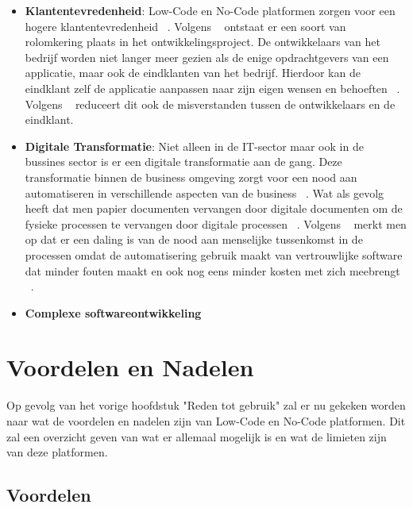 \begin{itemize}
    \item \textbf{Klantentevredenheid}:
    Low-Code en No-Code platformen zorgen voor een hogere klantentevredenheid ~\autocite{Elshan2023}.
    Volgens ~\textcite{Elshan2023} ontstaat er een soort van rolomkering plaats in het ontwikkelingsproject. De ontwikkelaars van het bedrijf worden niet langer meer gezien als de enige
    opdrachtgevers van een applicatie, maar ook de eindklanten van het bedrijf. Hierdoor kan de eindklant zelf de applicatie aanpassen naar zijn eigen wensen en behoeften ~\autocite{Elshan2023}.
    Volgens ~\textcite{Elshan2023} reduceert dit ook de misverstanden tussen de ontwikkelaars en de eindklant.
    \item \textbf{Digitale Transformatie}: 
    Niet alleen in de IT-sector maar ook in de bussines sector is er een digitale transformatie aan de gang. 
    Deze transformatie binnen de business omgeving zorgt voor een nood aan automatiseren in verschillende aspecten van de business ~\autocite{ALSAADI_2021}.
    Wat als gevolg heeft dat men papier documenten vervangen door digitale documenten om de fysieke processen te vervangen door digitale processen ~\autocite{ALSAADI_2021}.
    Volgens ~\textcite{ALSAADI_2021} merkt men op dat er een daling is van de nood aan menselijke tussenkomst in de processen omdat de automatisering gebruik maakt van vertrouwlijke software 
    dat minder fouten maakt en ook nog eens minder kosten met zich meebrengt ~\autocite{ALSAADI_2021}.
    \item \textbf{Complexe softwareontwikkeling}
  \end{itemize} 

\section{Voordelen en Nadelen}
\label{sec:voordelen-nadelen}
Op gevolg van het vorige hoofdstuk "Reden tot gebruik" zal er nu gekeken worden naar wat de voordelen en nadelen zijn van Low-Code en No-Code platformen. Dit zal
een overzicht geven van wat er allemaal mogelijk is en wat de limieten zijn van deze platformen.
\subsection{Voordelen}%
\label{subsec:voordelen}
